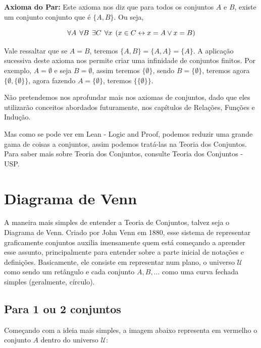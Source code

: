   \textbf{Axioma do Par:} Este axioma nos diz que para todos os conjuntos $A$ e $B$, existe um conjunto conjunto que é $\{A,B\}$. Ou seja,

    \[\forall A \hspace{1.5mm} \forall B \hspace{1.5mm} \exists C \hspace{1.5mm} \forall x \hspace{1.5mm} (x \in C \leftrightarrow x = A \vee x = B)\]

  Vale ressaltar que se $A=B$, teremos $\{A,B\}=\{A,A\}=\{A\}$. A aplicação sucessiva deste axioma nos permite criar uma infinidade de conjuntos finitos. Por exemplo, $A=\emptyset$ e seja $B=\emptyset$, assim teremos $\{\emptyset\}$, sendo $B=\{\emptyset\}$, teremos agora $\{\emptyset,\{\emptyset\}\}$, agora fazendo $A=\{\emptyset\}$, teremos $\{\{\emptyset\}\}$.

  Não pretendemos nos aprofundar mais nos axiomas de conjuntos, dado que eles utilizarão conceitos abordados futuramente, nos capítulos de Relações, Funções e Indução.

  Mas como se pode ver em Lean - Logic and Proof, podemos reduzir uma grande gama de coisas a conjuntos, assim podemos tratá-las na Teoria dos Conjuntos. Para saber mais sobre Teoria dos Conjuntos, consulte Teoria dos Conjuntos - USP.

\section{Diagrama de Venn}
A maneira mais simples de entender a Teoria de Conjuntos, talvez seja o Diagrama de Venn. Criado por John Venn em 1880, esse sistema de representar graficamente conjuntos auxilia imensamente quem está começando a aprender esse assunto, principalmente para entender sobre a parte inicial de notações e definições. Basicamente, ele consiste em representar num plano, o universo $\mathcal U$ como sendo um retângulo e cada conjunto $A,B,...$ como uma curva fechada simples (geralmente, círculo).

  \subsection{Para 1 ou 2 conjuntos}
  Começando com a ideia mais simples, a imagem abaixo representa em vermelho o conjunto $A$ dentro do universo $\mathcal U$:


